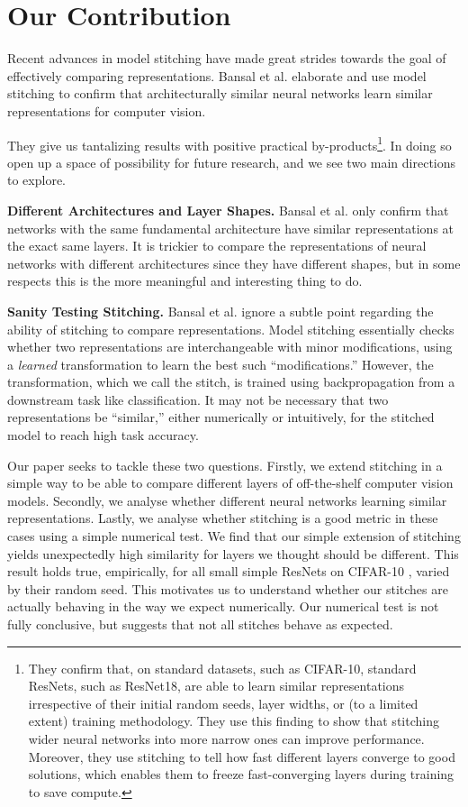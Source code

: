 \documentclass{article} %
\begin{document}
\section{Our Contribution}
\label{Contribution}
Recent advances in model stitching \cite{Bansal2021RevisitingMS} have made great strides towards the goal of effectively
comparing representations. Bansal et al. elaborate and use model stitching to confirm that architecturally similar
neural networks learn similar representations for computer vision.

They give us tantalizing results with positive practical by-products\footnote{
   They confirm that, on standard datasets, such as CIFAR-10, standard ResNets, such as ResNet18, are able to learn similar
   representations irrespective of their initial random seeds, layer widths, or (to a limited extent) training methodology.
   They use this finding to show that stitching wider neural networks into more narrow ones can improve performance. Moreover,
   they use stitching to tell how fast different layers converge to good solutions, which enables them to freeze
   fast-converging layers during training to save compute.
}.
In doing so open up a space of possibility for future research, and we see two main directions to explore.

\textbf{Different Architectures and Layer Shapes.} Bansal et al. only confirm that networks with the same 
fundamental architecture have similar representations at
the exact same layers. It is trickier to compare the representations of neural networks with different architectures
since they have different shapes, but in some respects this is the more meaningful and interesting thing to do.

\textbf{Sanity Testing Stitching.} Bansal et al. ignore a subtle point regarding the ability 
of stitching to compare representations. Model stitching essentially checks whether two representations
are interchangeable with minor modifications, using a \textit{learned} transformation to learn the best
such ``modifications.'' However, the transformation, which we call the stitch, is trained using backpropagation
from a downstream task like classification. It may not be necessary that two representations be ``similar,'' either
numerically or intuitively, for the stitched model to reach high task accuracy.

Our paper seeks to tackle these two questions. Firstly, we extend stitching in a simple way to be able to compare
different layers of off-the-shelf computer vision models. Secondly, we analyse 
whether different neural networks learning similar
representations. Lastly, we analyse whether stitching is a good metric in these cases using a simple numerical test. We
find that our simple extension of stitching yields unexpectedly high similarity for layers we thought should be different.
This result holds true, empirically, for all small simple ResNets \cite{He2016DeepRL} on CIFAR-10 \cite{CIFAR10},
varied by their random seed. This motivates
us to understand whether our stitches are actually behaving in the way we expect numerically. Our numerical test is not
fully conclusive, but suggests that not all stitches behave as expected.
\end{document}
